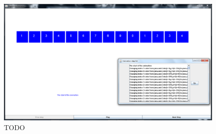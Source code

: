 \begin{figure}
\begin{center}
\includegraphics[width=\textwidth]{images/animationWindow.png}
\end{center}
\caption{TODO}
\label{fig:refactoring}
\end{figure}